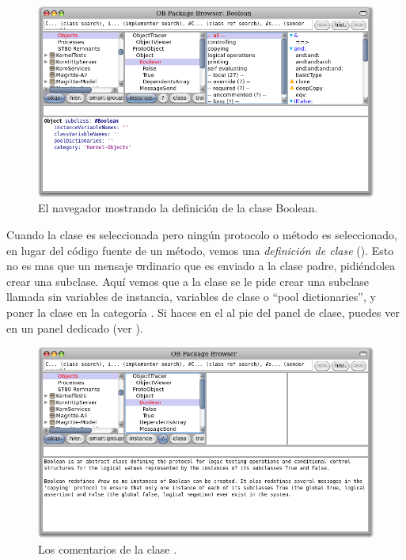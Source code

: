 \documentclass[a4paper,10pt,twoside]{book}
\begin{document}

\begin{figure}[hbt]
\centerline {\includegraphics[width=\textwidth]{Kernel-objects-boolean}}
\caption{El navegador mostrando la definici\'on de la clase Boolean.
}
\end{figure}

Cuando la clase  es seleccionada pero ning\'un protocolo o m\'etodo es seleccionado, en lugar del c\'odigo fuente de un m\'etodo, vemos una \emph{definici\'on de clase} ().
Esto no es mas que un mensaje \st ordinario que es enviado a la clase padre, pidi\'endolea crear una subclase.
Aqu\'i vemos que a la clase  se le pide crear una subclase llamada  sin variables de instancia, variables de clase o ``pool dictionaries'', y poner la clase  en la categor\'ia .
Si haces \click en el  al pie del panel de clase, puedes ver  en un panel dedicado (ver ).

\begin{figure}[hbt]
\centerline {\includegraphics[width=\textwidth]{classComment}}
\caption{Los comentarios de la clase .
}
\end{figure}
\end{document}
